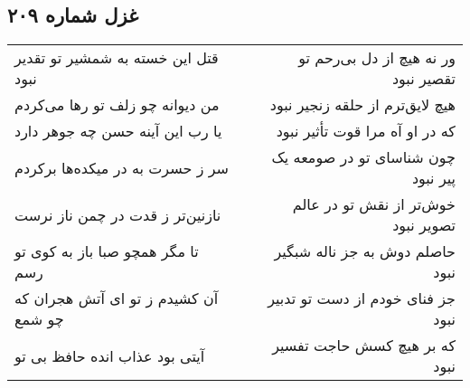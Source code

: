 \begin{center}
\section*{غزل شماره ۲۰۹}
\label{sec:sh209}
\begin{longtable}{l p{0.5cm} r}
قتل این خسته به شمشیر تو تقدیر نبود
&&
ور نه هیچ از دل بی‌رحم تو تقصیر نبود
\\
من دیوانه چو زلف تو رها می‌کردم
&&
هیچ لایق‌ترم از حلقه زنجیر نبود
\\
یا رب این آینه حسن چه جوهر دارد
&&
که در او آه مرا قوت تأثیر نبود
\\
سر ز حسرت به در میکده‌ها برکردم
&&
چون شناسای تو در صومعه یک پیر نبود
\\
نازنین‌تر ز قدت در چمن ناز نرست
&&
خوش‌تر از نقش تو در عالم تصویر نبود
\\
تا مگر همچو صبا باز به کوی تو رسم
&&
حاصلم دوش به جز ناله شبگیر نبود
\\
آن کشیدم ز تو ای آتش هجران که چو شمع
&&
جز فنای خودم از دست تو تدبیر نبود
\\
آیتی بود عذاب انده حافظ بی تو
&&
که بر هیچ کسش حاجت تفسیر نبود
\\
\end{longtable}
\end{center}
